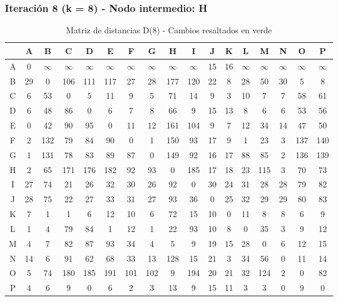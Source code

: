 \documentclass[12pt]{article}
\begin{document}
\subsubsection{Iteración 8 (k = 8) - Nodo intermedio: H}
\begin{table}[h!]
\centering
\begin{tabular}{|c|c|c|c|c|c|c|c|c|c|c|c|c|c|c|c|c|}
\hline
 & A & B & C & D & E & F & G & H & I & J & K & L & M & N & O & P \\\hline
A & 0 & $\infty$ & $\infty$ & $\infty$ & $\infty$ & $\infty$ & $\infty$ & $\infty$ & $\infty$ & 15 & 16 & $\infty$ & $\infty$ & $\infty$ & $\infty$ & $\infty$ \\\hline
B & 29 & 0 & 106 & 111 & 117 & 27 & 28 & 177 & 120 & 22 & 8 & 28 & 50 & 30 & 5 & 8 \\\hline
C & 6 & 53 & 0 & 5 & 11 & 9 & 5 & 71 & 14 & 9 & 3 & 10 & 7 & 7 & 58 & 61 \\\hline
D & 6 & 48 & 86 & 0 & 6 & 7 & 8 & 66 & 9 & 15 & 13 & 8 & 6 & 6 & 53 & 56 \\\hline
E & 0 & 42 & 90 & 95 & 0 & 11 & 12 & 161 & 104 & 9 & 7 & 12 & 34 & 14 & 47 & 50 \\\hline
F & 2 & 132 & 79 & 84 & 90 & 0 & 1 & 150 & 93 & 17 & 9 & 1 & 23 & 3 & 137 & 140 \\\hline
G & 1 & 131 & 78 & 83 & 89 & 87 & 0 & 149 & 92 & 16 & 17 & 88 & 85 & 2 & 136 & 139 \\\hline
H & 2 & 65 & 171 & 176 & 182 & 92 & 93 & 0 & 185 & 17 & 18 & 23 & 115 & 3 & 70 & 73 \\\hline
I & 27 & 74 & 21 & 26 & 32 & 30 & 26 & 92 & 0 & 30 & 24 & 31 & 28 & 28 & 79 & 82 \\\hline
J & 28 & 75 & 22 & 27 & 33 & 31 & 27 & 93 & 36 & 0 & 25 & 32 & 29 & 29 & 80 & 83 \\\hline
K & 7 & 1 & 1 & 6 & 12 & 10 & 6 & 72 & 15 & 10 & 0 & 11 & 8 & 8 & 6 & 9 \\\hline
L & 1 & 4 & 79 & 84 & 1 & 12 & 1 & 22 & 93 & 10 & 8 & 0 & 35 & 3 & 9 & 12 \\\hline
M & 4 & 7 & 82 & 87 & 93 & 34 & 4 & 5 & 9 & 19 & 15 & \cellcolor{lightgreen} 28 & 0 & 6 & 12 & 15 \\\hline
N & 14 & 6 & 91 & 62 & 68 & 33 & 13 & 128 & 15 & 21 & 3 & 34 & 56 & 0 & 11 & 14 \\\hline
O & 5 & \cellcolor{lightgreen} 74 & \cellcolor{lightgreen} 180 & \cellcolor{lightgreen} 185 & \cellcolor{lightgreen} 191 & \cellcolor{lightgreen} 101 & \cellcolor{lightgreen} 102 & 9 & \cellcolor{lightgreen} 194 & 20 & 21 & \cellcolor{lightgreen} 32 & \cellcolor{lightgreen} 124 & 2 & 0 & \cellcolor{lightgreen} 82 \\\hline
P & 4 & 6 & 9 & 0 & 6 & 2 & 3 & 13 & 9 & 15 & 11 & 3 & 3 & 0 & 9 & 0 \\\hline
\end{tabular}
\caption{Matriz de distancias D(8) - Cambios resaltados en verde}
\end{table}
\end{document}
